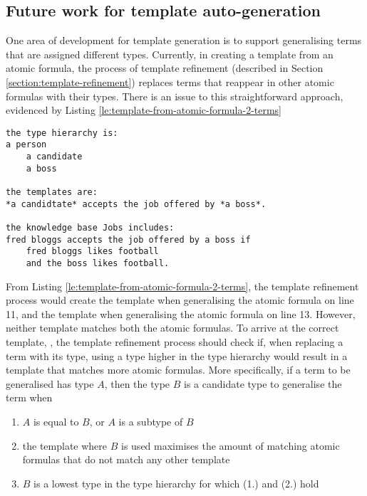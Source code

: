 \documentclass[../main.tex]{subfiles}
\begin{document}
\subsection{Future work for template auto-generation}
One area of development for template generation is to support generalising terms that are assigned different types. Currently, in creating a template from an atomic formula, the process of template refinement (described in Section \ref{section:template-refinement}) replaces terms that reappear in other atomic formulas with their types. There is an issue to this straightforward approach, evidenced by Listing \ref{le:template-from-atomic-formula-2-terms}
\newpage
\begin{lstlisting}[language={LE}, label={le:template-from-atomic-formula-2-terms}, caption={An extract of a Logical English program in which an atomic formula without a template appears twice, with arguments of different types.}]
the type hierarchy is:
a person
    a candidate
    a boss

the templates are:
*a candidtate* accepts the job offered by *a boss*.

the knowledge base Jobs includes:
fred bloggs accepts the job offered by a boss if
    fred bloggs likes football
    and the boss likes football.
\end{lstlisting}
From Listing \ref{le:template-from-atomic-formula-2-terms}, the template refinement process would create the template  when generalising the atomic formula on line 11, and the template  when generalising the atomic formula on line 13. However, neither template matches both the atomic formulas. To arrive at the correct template, , the template refinement process should check if, when replacing a term with its type, using a type higher in the type hierarchy would result in a template that matches more atomic formulas. More specifically, if a term to be generalised has type $A$, then the type $B$ is a candidate type to generalise the term when
\begin{enumerate}
    \item $A$ is equal to $B$, or $A$ is a subtype of $B$
    \item the template where $B$ is used maximises the amount of matching atomic formulas that do not match any other template
    \item $B$ is a lowest type in the type hierarchy for which (1.) and (2.) hold
\end{enumerate}
\end{document}
